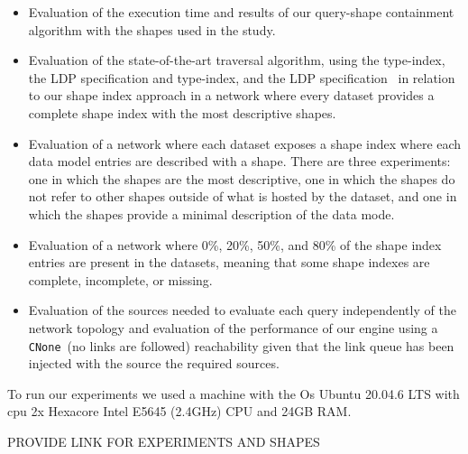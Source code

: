 \begin{itemize}
   \item Evaluation of the execution time and results of our query-shape containment algorithm with the shapes used in the study.
   \item Evaluation of the state-of-the-art traversal algorithm, using the type-index, the LDP specification and type-index, and the LDP specification~\cite{Taelman2023} in relation to our shape index approach in a network where every dataset provides a complete shape index with the most descriptive shapes.
   \item Evaluation of a network where each dataset exposes a shape index where each data model entries are described with a shape. 
   There are three experiments: one in which the shapes are the most descriptive, one in which the shapes do not refer to other shapes outside of what is hosted by the dataset, and one in which the shapes provide a minimal description of the data mode.
   \item Evaluation of a network where 0\%, 20\%, 50\%, and 80\% of the shape index entries are present in the datasets, meaning that some shape indexes are complete, incomplete, or missing.
   \item Evaluation of the sources needed to evaluate each query independently of the network topology and evaluation of the performance of our engine using a \texttt{CNone}~\cite{Hartig2012}(no links are followed) reachability given that the link queue has been injected with the source the required sources.
 \end{itemize}

To run our experiments we used a machine with the Os Ubuntu 20.04.6 LTS with cpu 2x Hexacore Intel E5645 (2.4GHz) CPU and 24GB RAM.

PROVIDE LINK FOR EXPERIMENTS AND SHAPES
\iffalse
102x pcgen3 nodes
https://doc.ilabt.imec.be/ilabt/virtualwall/hardware.html#virtual-wall-2
\fi
